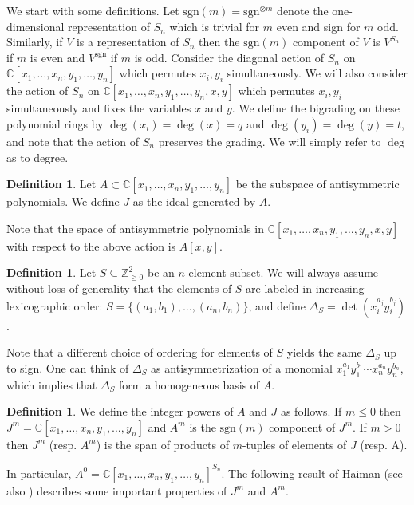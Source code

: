 \documentclass[12pt]{amsart}
\newcommand{\C}{\mathbb{C}}
\newcommand{\Z}{\mathbb{Z}}
\newcommand{\sgn}{\mathrm{sgn}}
\numberwithin{equation}{section}
\theoremstyle{definition}
\newtheorem{definition}[theorem]{Definition}
\begin{document}
We start with some definitions.  Let $\sgn(m)=\sgn^{\otimes m}$ denote the one-dimensional representation of $S_n$ which is trivial for $m$ even and sign for $m$ odd. Similarly, if $V$ is a representation of $S_n$ then the $\sgn(m)$ component of $V$ is $V^{S_n}$ if $m$ is even and $V^{\sgn}$ if $m$ is odd. Consider the diagonal action of $S_n$ on $\C[x_1,\ldots,x_n,y_1,\ldots,y_n]$ which permutes $x_i, y_i$ simultaneously. We will also consider the action of $S_n$ on $\C[x_1,\ldots,x_n,y_1,\ldots,y_n,x,y]$ which  permutes $x_i, y_i$ simultaneously and fixes the variables $x$ and $y$. We define the bigrading on these polynomial rings by $\deg(x_i)=\deg(x)=q$ and $\deg(y_i)=\deg(y)=t$, and note that the action of $S_n$ preserves the grading. We will simply refer to $\deg$ as to degree.

\begin{definition}
Let $A\subset \C[x_1,\ldots,x_n,y_1,\ldots,y_n]$ be the subspace of antisymmetric polynomials. We define $J$ as the ideal generated by $A$.
\end{definition}

Note that the space of antisymmetric polynomials in 
$\C[x_1,\ldots,x_n,y_1,\ldots,y_n,x,y]$ with respect to the above action is $A[x,y]$.

\begin{definition}
\label{def: delta S}
Let $S\subseteq \Z^2_{\ge 0}$ be an $n$-element subset. We will always assume without loss of generality that the elements of $S$ are labeled in increasing lexicographic order: $S=\{(a_1,b_1),\ldots,(a_n,b_n)\}$, and define $\Delta_{S}=\det(x_i^{a_j}y_i^{b_j})$. 
\end{definition}

Note that a different choice of ordering for elements of $S$ yields the same $\Delta_S$ up to sign. One can think of $\Delta_S$ as antisymmetrization of a monomial $x_1^{a_1}y_1^{b_1}\cdots x_n^{a_n}y_n^{b_n}$, which implies that $\Delta_S$ form a homogeneous basis of $A$. 

\begin{definition}
We define the integer powers of $A$ and $J$ as follows. If $m\le 0$ then
$
J^m=\C[x_1,\ldots,x_n,y_1,\ldots,y_n]
$
and $A^m$ is the $\sgn(m)$ component of $J^m$. If $m>0$ then $J^m$ (resp. $A^m$) is the span of products of $m$-tuples of elements of $J$ (resp. A).
\end{definition}

In particular, $A^0=\C[x_1,\ldots,x_n,y_1,\ldots,y_n]^{S_n}$. The following result of Haiman (see also \cite[Lemma 3.12]{C}) describes some important properties of $J^m$ and $A^m$.
\end{document}
